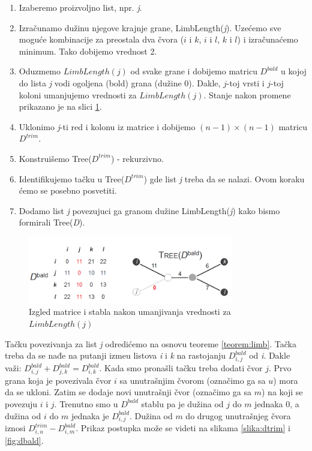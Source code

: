 \begin{enumerate}
	\item Izaberemo proizvoljno list, npr. \textit{j}. 
	\item Izra\v{c}unamo du\v{z}inu njegove krajnje grane, LimbLength(\textit{j}). Uzećemo sve moguće kombinacije za preostala dva čvora ($i$ i $k$, $i$ i $l$, $k$ i $l$) i izračunaćemo minimum. Tako dobijemo vrednost 2.
	\item Oduzmemo $LimbLength(\textit{j})$ od svake grane i dobijemo matricu \textit{$D^{bald}$}  u kojoj do lista \textit{j} vodi ogoljena (bold) grana (du\v{z}ine 0). Dakle, $j$-toj vrsti i $j$-toj koloni umanjujemo vrednosti za $LimbLength(\textit{j})$. Stanje nakon promene prikazano je na slici \ref{dbald}.   
	\item Uklonimo \textit{j}-ti red i kolonu iz matrice i dobijemo $(n - 1) \times (n - 1)$ matricu \textit{$D^{trim}$}. 
	\item  Konstrui\v{s}emo Tree($D^{trim}$) - rekurzivno. 
	\item Identifikujemo ta\v{c}ku u Tree($D^{trim}$) gde list \textit{j} treba da se nalazi. Ovom koraku ćemo se posebno posvetiti. 
	\item  Dodamo list \textit{j} povezujuci ga granom du\v{z}ine LimbLength(\textit{j}) kako bismo formirali Tree(\textit{D}). 
\end{enumerate}


\begin{figure}[h!]
	\begin{center}
		\includegraphics[width=0.8\textwidth]{poglavlja/7/slike/Dbold.png}
	\end{center}
	\caption{Izgled matrice i stabla nakon umanjivanja vrednosti za $LimbLength(\textit{j})$}
	\label{dbald}
\end{figure}

Ta\v{c}ku povezivanja za list \textit{j} odredićemo na osnovu teoreme \ref{teorem:limb}.  Tačka treba da se nađe na putanji izme\dj u listova \textit{i} i \textit{k} na rastojanju $D^{bald}_{i, j}$ od \textit{i}. Dakle va\v{z}i: $D^{bald}_{i, j} + D^{bald}_{j, k} = D^{bald}_{i, k}$. Kada smo pronašli tačku treba dodati čvor $j$. Prvo grana koja je povezivala čvor $i$ sa unutrašnjim čvorom (označimo ga sa $u$) mora da se ukloni. Zatim se dodaje novi unutrašnji čvor (označimo ga sa $m$) na koji se povezuju $i$ i $j$. Trenutno smo u $D^{bald}$ stablu pa je dužina od $j$ do $m$ jednaka 0, a dužina od $i$ do $m$ jednaka je $D^{bald}_{i, j}$. Dužina od $m$ do drugog unutrašnjeg čvora iznosi $D^{trim}_{i, u} - D^{bald}_{i, m}$. Prikaz postupka može se videti na slikama \ref{slika:dtrim} i \ref{fig:dbald}.




